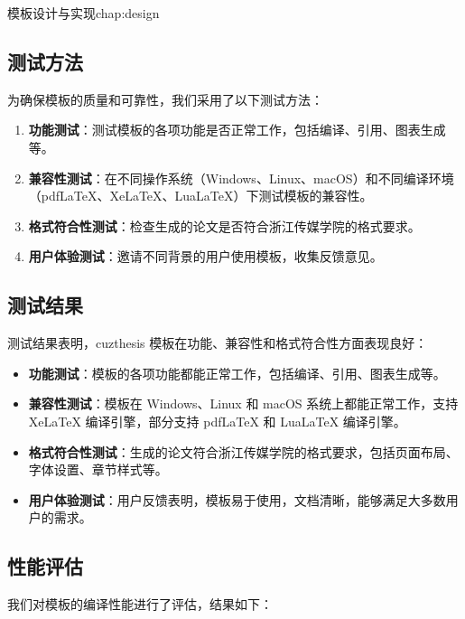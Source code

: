 \begin{cuzchapter}{模板设计与实现}{chap:design}
	\subsection{测试方法}
	
	为确保模板的质量和可靠性，我们采用了以下测试方法：
	
	\begin{enumerate}
		\item \textbf{功能测试}：测试模板的各项功能是否正常工作，包括编译、引用、图表生成等。
		
		\item \textbf{兼容性测试}：在不同操作系统（Windows、Linux、macOS）和不同编译环境（pdfLaTeX、XeLaTeX、LuaLaTeX）下测试模板的兼容性。
		
		\item \textbf{格式符合性测试}：检查生成的论文是否符合浙江传媒学院的格式要求。
		
		\item \textbf{用户体验测试}：邀请不同背景的用户使用模板，收集反馈意见。
	\end{enumerate}
	
	\subsection{测试结果}
	
	测试结果表明，cuzthesis 模板在功能、兼容性和格式符合性方面表现良好：
	
	\begin{itemize}
		\item \textbf{功能测试}：模板的各项功能都能正常工作，包括编译、引用、图表生成等。
		
		\item \textbf{兼容性测试}：模板在 Windows、Linux 和 macOS 系统上都能正常工作，支持 XeLaTeX 编译引擎，部分支持 pdfLaTeX 和 LuaLaTeX 编译引擎。
		
		\item \textbf{格式符合性测试}：生成的论文符合浙江传媒学院的格式要求，包括页面布局、字体设置、章节样式等。
		
		\item \textbf{用户体验测试}：用户反馈表明，模板易于使用，文档清晰，能够满足大多数用户的需求。
	\end{itemize}
	
	\subsection{性能评估}
	
	我们对模板的编译性能进行了评估，结果如下：
	

\end{cuzchapter}
